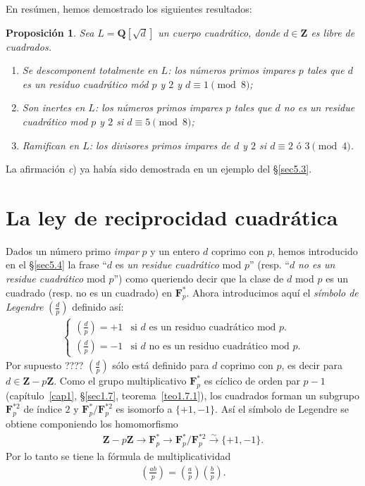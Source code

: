 \documentclass[bibtotoc,leqno,spanish]{amsbook}
\newcommand{\QQ}{\mathbf{Q}}
\newcommand{\ZZ}{\mathbf{Z}}
\newcommand{\FF}{\mathbf{F}}
\renewcommand{\to}[1][]{\xrightarrow{#1}}
\newcommand{\leg}[2]{\left(\frac{#1}{#2}\right)}
\numberwithin{equation}{section}
\theoremstyle{note}
\theoremstyle{note}
\newtheorem{proposition}{Proposici\'on}
\theoremstyle{rem}
\numberwithin{theorem}{section}
\numberwithin{proposition}{section}
\numberwithin{definition}{section}
\numberwithin{lemma}{section}
\numberwithin{corollary}{section}
\numberwithin{example}{section}
\numberwithin{footnote}{section}%
\begin{document}
En res\'umen, hemos demostrado los siguientes resultados:

\begin{proposition}\label{prop5.4.1}
Sea $L = \QQ[\sqrt{d}]$ un cuerpo cuadr\'atico, donde $d\in\ZZ$ es libre de cuadrados.
\begin{enumerate}
\item Se descomponent totalmente en $L$: los n\'umeros primos impares $p$ tales que
$d$ es un residuo cuadr\'atico m\'od $p$ y $2$ y $d\equiv 1\pmod 8$;
\item Son inertes en $L${\upshape:} los n\'umeros primos impares $p$ tales que $d$ no es un
residue cuadr\'atico mod $p$ y $2$ si $d\equiv 5\pmod 8$;
\item Ramifican en $L$: los divisores primos impares de $d$ y $2$ si $d\equiv 2\text{ \'o }3\pmod 4$.
\end{enumerate}
\end{proposition}

La afirmaci\'on {\itshape c}) ya hab\'ia sido demostrada en un ejemplo del \S\ref{sec5.3}.

\section{La ley de reciprocidad cuadr\'atica}\label{sec5.5}

Dados un n\'umero primo {\em impar} $p$ y un entero $d$ coprimo con $p$, hemos introducido en el \S\ref{sec5.4}
la frase ``$d$ es {\em un residue cuadr\'atico} mod $p$'' (resp. ``$d$ {\em no es un residue cuadr\'atico}
mod $p$'') como queriendo decir que la clase de $d$ mod $p$ es un cuadrado (resp. no es un cuadrado) en
$\FF_{p}^{*}$. Ahora introducimos aqu\'i el {\em s\'imbolo de Legendre} $\left(\frac{d}{p}\right)$ definido
as\'i:
\begin{gather}
\begin{cases}
\left(\frac{d}{p}\right) = +1  & \text{si $d$ es un residuo cuadr\'atico mod $p$.}\\
\left(\frac{d}{p}\right) = -1 & \text{si $d$ no es un residuo cuadr\'atico mod $p$.}
\end{cases}
\end{gather}
Por supuesto ???? $\leg{d}{p}$ s\'olo est\'a definido para $d$ coprimo con $p$, es decir para
$d\in\ZZ-p\ZZ$. Como el grupo multiplicativo $\FF_{p}^{*}$ es c\'iclico de orden par $p-1$
(cap\'itulo~\ref{cap1}, \S\ref{sec1.7}, teorema~\ref{teo1.7.1}), los cuadrados forman un subgrupo $\FF_{p}^{*2}$ de \'indice $2$ y
$\FF_{p}^{*}/\FF_{p}^{*2}$ es isomorfo a $\{+1,-1\}$. As\'i el s\'imbolo de Legendre se obtiene componiendo
los homomorfismo
\begin{gather*}
\ZZ-p\ZZ\to\FF_{p}^{*}\to\FF_{p}^{*}/\FF_{p}^{*2}\to[\sim]\{+1,-1\}.
\end{gather*}
Por lo tanto se tiene la f\'ormula de multiplicatividad
\begin{gather}\label{eq-5.5-2}
\leg{ab}{p} = \leg{a}{p}\leg{b}{p}.
\end{gather}
\end{document}
